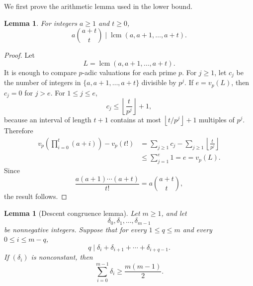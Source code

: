 \documentclass[11pt]{article}
\newtheorem{lemma}[theorem]{Lemma}
\theoremstyle{remark}
\newcommand{\lcm}{\operatorname{lcm}}
\newcommand{\floor}[1]{\left\lfloor #1\right\rfloor}
\numberwithin{equation}{section}
\begin{document}
We first prove the arithmetic lemma used in the lower bound.

\begin{lemma}\label{lem:lcm}
For integers $a\ge1$ and $t\ge0$,
\[
        a\binom{a+t}{t}
        \mid
        \lcm(a,a+1,\ldots,a+t).
\]
\end{lemma}

\begin{proof}
Let
\[
        L=\lcm(a,a+1,\ldots,a+t).
\]
It is enough to compare $p$-adic valuations for each prime $p$.
For $j\ge1$, let $c_j$ be the number of integers in $\{a,a+1,\ldots,a+t\}$ divisible by $p^j$.
If $e=v_p(L)$, then $c_j=0$ for $j>e$.
For $1\le j\le e$,
\[
        c_j\le \floor{\frac{t}{p^j}}+1,
\]
because an interval of length $t+1$ contains at most $\floor{t/p^j}+1$ multiples of $p^j$.
Therefore
\[
\begin{aligned}
        v_p\!\left(\prod_{i=0}^t(a+i)\right)-v_p(t!)
        &=
        \sum_{j\ge1}c_j-
        \sum_{j\ge1}\floor{\frac{t}{p^j}} \\
        &\le
        \sum_{j=1}^e 1
        =e
        =v_p(L).
\end{aligned}
\]
Since
\[
        \frac{a(a+1)\cdots(a+t)}{t!}
        =
        a\binom{a+t}{t},
\]
the result follows.
\end{proof}

\begin{lemma}[Descent congruence lemma]\label{lem:sequence}
Let $m\ge1$, and let
\[
        \delta_0,\delta_1,\ldots,\delta_{m-1}
\]
be nonnegative integers.
Suppose that for every $1\le q\le m$ and every $0\le i\le m-q$,
\[
        q\mid \delta_i+\delta_{i+1}+\cdots+\delta_{i+q-1}.
\]
If $(\delta_i)$ is nonconstant, then
\[
        \sum_{i=0}^{m-1}\delta_i\ge \frac{m(m-1)}2.
\]
\end{lemma}
\end{document}
